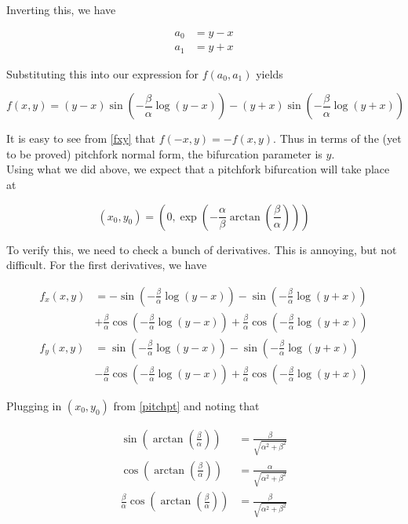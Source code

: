 \documentclass[12pt]{article}
\begin{document}
\begin{enumerate}
Inverting this, we have

\begin{align*}
a_0 &= y - x \\
a_1 &= y + x
\end{align*}

Substituting this into our expression for $f(a_0, a_1)$ yields

\begin{equation}\label{fxy}
f(x, y) = 
(y - x) \sin \left( - \frac{\beta}{\alpha} \log(y - x) \right) - (y + x) \sin \left( - \frac{\beta}{\alpha} \log (y + x) \right)
\end{equation}

It is easy to see from \eqref{fxy} that $f(-x, y) = -f(x, y)$. Thus in terms of the (yet to be proved) pitchfork normal form, the bifurcation parameter is $y$.\\

Using what we did above, we expect that a pitchfork bifurcation will take place at

\begin{equation}\label{pitchpt}
(x_0, y_0) = \left( 0, \exp \left( -\frac{\alpha}{\beta} \arctan \left( \frac{\beta}{\alpha}\right) \right) \right)
\end{equation}

To verify this, we need to check a bunch of derivatives. This is annoying, but not difficult. For the first derivatives, we have

\begin{align*}
f_x(x, y) &= -\sin \left( - \frac{\beta}{\alpha} \log(y - x) \right) - 
\sin \left( - \frac{\beta}{\alpha} \log(y + x) \right) \\
&+\frac{\beta}{\alpha} \cos \left( - \frac{\beta}{\alpha} \log(y - x) \right) + \frac{\beta}{\alpha} \cos \left( - \frac{\beta}{\alpha} \log(y + x) \right) \\
f_y(x, y) &= \sin \left( - \frac{\beta}{\alpha} \log(y - x) \right) - 
\sin \left( - \frac{\beta}{\alpha} \log(y + x) \right) \\
&-\frac{\beta}{\alpha} \cos \left( - \frac{\beta}{\alpha} \log(y - x) \right) + \frac{\beta}{\alpha} \cos \left( - \frac{\beta}{\alpha} \log(y + x) \right)
\end{align*}

Plugging in $(x_0, y_0)$ from \eqref{pitchpt} and noting that

\begin{align*}
\sin \left( \arctan \left( \frac{\beta}{\alpha}\right) \right) &=
\frac{\beta}{\sqrt{\alpha^2 + \beta^2}} \\
\cos \left( \arctan \left( \frac{\beta}{\alpha}\right) \right) &=
\frac{\alpha}{\sqrt{\alpha^2 + \beta^2}} \\
\frac{\beta}{\alpha} \cos \left( \arctan \left( \frac{\beta}{\alpha}\right) \right) &=
\frac{\beta}{\sqrt{\alpha^2 + \beta^2}} \\
\end{align*}


\end{enumerate}
\end{document}
